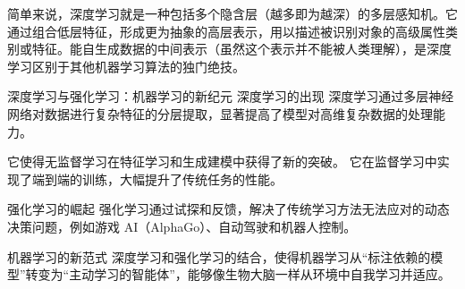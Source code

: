 
简单来说，深度学习就是一种包括多个隐含层（越多即为越深）的多层感知机。它通过组合低层特征，形成更为抽象的高层表示，用以描述被识别对象的高级属性类别或特征。能自生成数据的中间表示（虽然这个表示并不能被人类理解），是深度学习区别于其他机器学习算法的独门绝技。


深度学习与强化学习：机器学习的新纪元
深度学习的出现
深度学习通过多层神经网络对数据进行复杂特征的分层提取，显著提高了模型对高维复杂数据的处理能力。

它使得无监督学习在特征学习和生成建模中获得了新的突破。
它在监督学习中实现了端到端的训练，大幅提升了传统任务的性能。

强化学习的崛起
强化学习通过试探和反馈，解决了传统学习方法无法应对的动态决策问题，例如游戏 AI（AlphaGo）、自动驾驶和机器人控制。

机器学习的新范式
深度学习和强化学习的结合，使得机器学习从“标注依赖的模型”转变为“主动学习的智能体”，能够像生物大脑一样从环境中自我学习并适应。
